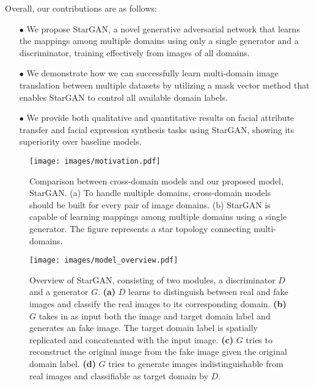 \documentclass[10pt,twocolumn,letterpaper]{article}
\begin{document}
\vspace{4px}

Overall, our contributions are as follows: 
\begin{enumerate}
\item[$\bullet$] We propose StarGAN, a novel generative adversarial network that learns the mappings among multiple domains using only a single generator and a discriminator, training effectively from images of all domains.
\item[$\bullet$] We demonstrate how we can successfully learn multi-domain image translation between multiple datasets by utilizing a mask vector method that enables StarGAN to control all available domain labels.
\item[$\bullet$] We provide both qualitative and quantitative results on facial attribute transfer and facial expression synthesis tasks using StarGAN, showing its superiority over baseline models.

\end{enumerate}




\begin{figure}[t]
\centering
\centerline{\texttt{[image: images/motivation.pdf]}}
\caption{Comparison between cross-domain models and our proposed model, StarGAN. (a) To handle multiple domains, cross-domain models should be built for every pair of image domains. (b) StarGAN is capable of learning mappings among multiple domains using a single generator. The figure represents a star topology connecting multi-domains.}
\label{motiv}
\end{figure}

\begin{figure*}[t]
\centering
\centerline{\texttt{[image: images/model\_overview.pdf]}}
\caption{Overview of StarGAN, consisting of two modules, a discriminator $D$ and a generator $G$. \textbf{(a)} $D$ learns to distinguish between real and fake images and classify the real images to its corresponding domain. \textbf{(b)} $G$ takes in as input both the image and target domain label and generates an fake image. The target domain label is spatially replicated and concatenated with the input image. \textbf{(c)} $G$ tries to reconstruct the original image from the fake image given the original domain label. \textbf{(d)} $G$ tries to generate images indistinguishable from real images and classifiable as target domain by $D$.}
\label{model}
\end{figure*}
\end{document}
